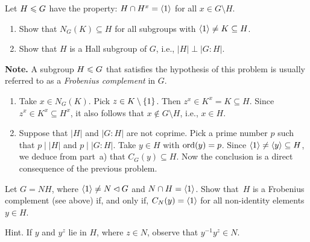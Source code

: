 \begin{probl}\label{problem-1.D.3}
    Let $H \leqslant G$ have the property: $H \cap H^x = \langle1\rangle$ for all $x\in G\setminus H$.
    \begin{enumerate}[\rm a)]
        \item Show that $N_G(K) \subseteq H$ for all subgroups with $\langle1\rangle\ne K \subseteq H$.
        \item Show that $H$ is a Hall subgroup of\/ $G$, i.e., $|H|\perp|G:H|$.
    \end{enumerate}
    \textbf{Note.} A subgroup $H\leqslant G$ that satisfies the hypothesis of this problem is usually referred to as a \textsl{Frobenius complement} in $G$.

\end{probl}

\begin{solution}
\begin{enumerate}[\rm a)]
    \item Take $x\in N_G(K)$. Pick $z\in K\setminus\{1\}$. Then $z^x\in K^x=K\subseteq H$. Since $z^x\in K^x\subseteq H^x$, it also follows that $x\notin G\setminus H$, i.e., $x\in H$.

    \item Suppose that $|H|$ and $|G:H|$ are not coprime. Pick a prime number $p$ such that $p\mid|H|$ and $p\mid|G:H|$. Take $y\in H$ with ${\rm ord}(y)=p$. Since $\langle1\rangle\ne\langle y\rangle\subseteq H$, we deduce from part~a) that $C_G(y)\subseteq H$. Now the conclusion is a direct consequence of the previous problem.
\end{enumerate}
\end{solution}


\begin{probl}
    Let\/ $G = NH$, where $\langle1\rangle \ne N\lhd G$ and\/ $N \cap H = \langle1\rangle$. Show that\/~$H$ is a Frobenius complement (see above) if, and only if, $C_N(y) = \langle1\rangle$ for all non-identity elements $y \in H$.

    \textrm{\rm Hint. If $y$ and $y^z$ lie in $H$, where $z \in N$, observe that $y^{-1}y^z \in N$.}
\end{probl}

